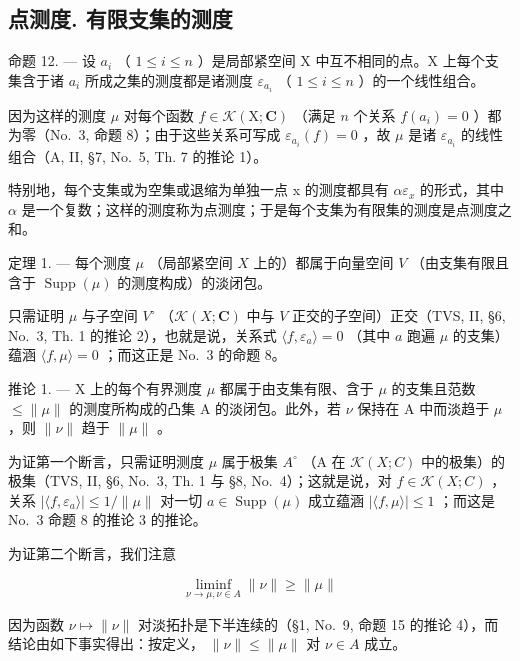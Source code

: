 \subsection{点测度. 有限支集的测度}

命题 12. --- 设 \(a_i\) （ \(1 \leqslant i \leqslant n\) ）是局部紧空间 X 中互不相同的点。X 上每个支集含于诸 \(a_i\) 所成之集的测度都是诸测度 \(\varepsilon_{a_i}\) （ \(1 \leqslant i \leqslant n\) ）的一个线性组合。

因为这样的测度 \(\mu\) 对每个函数 \(f\in\mathcal{K}(\mathrm{X};\mathbf{C})\) （满足 \(n\) 个关系 \(f(a_{i})=0\) ）都为零（No.~3, 命题 8）；由于这些关系可写成 \(\varepsilon_{a_{i}}(f)=0\) ，故 \(\mu\) 是诸 \(\varepsilon_{a_{i}}\) 的线性组合（A, II, §7, No.~5, Th. 7 的推论 1）。

特别地，每个支集或为空集或退缩为单独一点 x 的测度都具有 \(\alpha\varepsilon_{x}\) 的形式，其中 \(\alpha\) 是一个复数；这样的测度称为点测度；于是每个支集为有限集的测度是点测度之和。

定理 1. --- 每个测度 \(\mu\) （局部紧空间 \(X\) 上的）都属于向量空间 \(V\) （由支集有限且含于 \(\operatorname{Supp}(\mu)\) 的测度构成）的淡闭包。

只需证明 \(\mu\) 与子空间 \(V^{\circ}\) （\(\mathcal{K}(X; \mathbf{C})\) 中与 \(V\) 正交的子空间）正交（TVS, II, §6, No.~3, Th. 1 的推论 2），也就是说，关系式 \(\langle f, \varepsilon_{a} \rangle = 0\) （其中 \(a\) 跑遍 \(\mu\) 的支集）蕴涵 \(\langle f, \mu \rangle = 0\) ；而这正是 No.~3 的命题 8。

推论 1. --- X 上的每个有界测度 \(\mu\) 都属于由支集有限、含于 \(\mu\) 的支集且范数 \(\leqslant \| \mu \|\) 的测度所构成的凸集 A 的淡闭包。此外，若 \(\nu\) 保持在 A 中而淡趋于 \(\mu\) ，则 \(\| \nu \|\) 趋于 \(\| \mu \|\) 。

为证第一个断言，只需证明测度 \(\mu\) 属于极集 \(A^{\circ}\) （A 在 \(\mathcal{K}(X;C)\) 中的极集）的极集（TVS, II, §6, No.~3, Th. 1 与 §8, No.~4）；这就是说，对 \(f \in \mathcal{K}(X;C)\) ，关系 \(|\langle f,\varepsilon_{a}\rangle| \leqslant 1/\|\mu\|\) 对一切 \(a \in \operatorname{Supp}(\mu)\) 成立蕴涵 \(|\langle f,\mu\rangle| \leqslant 1\) ；而这是 No.~3 命题 8 的推论 3 的推论。

为证第二个断言，我们注意

\[
\liminf _ {\nu \to \mu ,   \nu \in A} \| \nu \| \geqslant \| \mu \|
\]

因为函数 \(\nu \mapsto \| \nu \|\) 对淡拓扑是下半连续的（§1, No.~9, 命题 15 的推论 4），而结论由如下事实得出：按定义， \(\| \nu \| \leqslant \| \mu \|\) 对 \(\nu \in A\) 成立。

